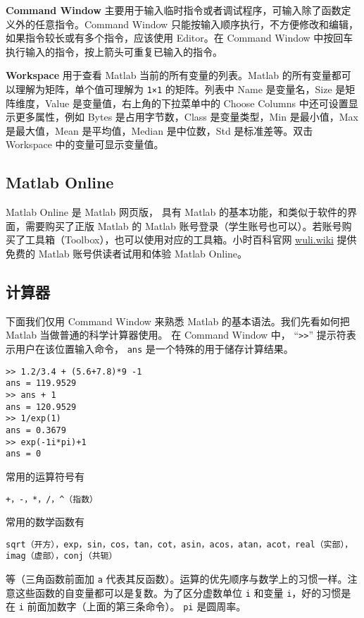 \textbf{Command Window} 主要用于输入临时指令或者调试程序，可输入除了函数定义外的任意指令。Command Window 只能按输入顺序执行，不方便修改和编辑，如果指令较长或有多个指令，应该使用 Editor。在 Command Window 中按回车执行输入的指令，按上箭头可重复已输入的指令。

\textbf{Workspace} 用于查看 Matlab 当前的所有变量的列表。Matlab 的所有变量都可以理解为矩阵，单个值可理解为 \verb|1×1| 的矩阵。列表中 Name 是变量名，Size 是矩阵维度，Value 是变量值，右上角的下拉菜单中的 Choose Columns 中还可设置显示更多属性，例如 Bytes 是占用字节数，Class 是变量类型，Min 是最小值，Max 是最大值，Mean 是平均值，Median 是中位数，Std 是标准差等。双击 Workspace 中的变量可显示变量值。

\subsection{Matlab Online}
Matlab Online 是 Matlab 网页版， 具有 Matlab 的基本功能，和类似于软件的界面，需要购买了正版 Matlab 的 Matlab 账号登录（学生账号也可以）。若账号购买了工具箱（Toolbox），也可以使用对应的工具箱。小时百科官网 \href{https://wuli.wiki}{wuli.wiki} 提供免费的 Matlab 账号供读者试用和体验 Matlab Online。

\subsection{计算器}
下面我们仅用 Command Window 来熟悉 Matlab 的基本语法。我们先看如何把 Matlab 当做普通的科学计算器使用。 在 Command Window 中， “\verb|>>|” 提示符表示用户在该位置输入命令， \verb|ans| 是一个特殊的用于储存计算结果。
\begin{lstlisting}[language=matlabC]
>> 1.2/3.4 + (5.6+7.8)*9 -1
ans = 119.9529
>> ans + 1
ans = 120.9529
>> 1/exp(1)
ans = 0.3679
>> exp(-1i*pi)+1
ans = 0
\end{lstlisting}
常用的运算符号有
\begin{lstlisting}[language=matlabC]
+，-，*，/，^（指数）
\end{lstlisting}
常用的数学函数有
\begin{lstlisting}[language=matlabC]
sqrt（开方），exp，sin，cos，tan，cot，asin，acos，atan，acot，real（实部），imag（虚部），conj（共轭）
\end{lstlisting}
等（三角函数前面加 \verb|a| 代表其反函数）。运算的优先顺序与数学上的习惯一样。注意这些函数的自变量都可以是复数。为了区分虚数单位 \verb|i| 和变量 \verb|i|，好的习惯是在 \verb|i| 前面加数字（上面的第三条命令）。 \verb|pi| 是圆周率。

